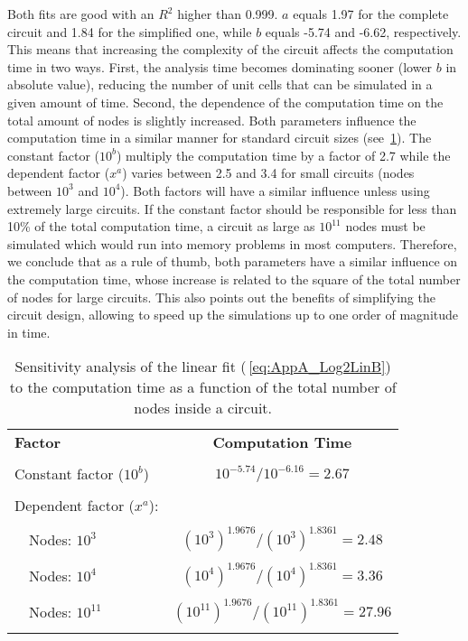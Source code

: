 Both fits are good with an $R^2$ higher than 0.999. $a$ equals 1.97 for the complete circuit and 1.84 for the simplified one, while $b$ equals -5.74 and -6.62, respectively. This means that increasing the complexity of the circuit affects the computation time in two ways. First, the analysis time becomes dominating sooner (lower $b$ in absolute value), reducing the number of unit cells that can be simulated in a given amount of time. Second, the dependence of the computation time on the total amount of nodes is slightly increased. Both parameters influence the computation time in a similar manner for standard circuit sizes (see \tab\,\ref{tab:AppA_ComputationTime}). The constant factor ($10^b$) multiply the computation time by a factor of 2.7 while the dependent factor ($x^a$) varies between 2.5 and 3.4 for small circuits (nodes between $10^3$ and $10^4$). Both factors will have a similar influence unless using extremely large circuits. If the constant factor should be responsible for less than 10\% of the total computation time, a circuit as large as $10^{11}$ nodes must be simulated which would run into memory problems in most computers. Therefore, we conclude that as a rule of thumb, both parameters have a similar influence on the computation time, whose increase is related to the square of the total number of nodes for large circuits. This also points out the benefits of simplifying the circuit design, allowing to speed up the simulations up to one order of magnitude in time.

\setlength{\extrarowheight}{0pt}
\begin{table}[h]
	\centering
	\caption[Sensitivity analysis of the linear fit to the computation time as a function of the total number of nodes inside a circuit.]{Sensitivity analysis of the linear fit (\equ\,\ref{eq:AppA_Log2LinB}) to the computation time as a function of the total number of nodes inside a circuit.}
	\label{tab:AppA_ComputationTime}
	\begin{tabularx}{.7\textwidth}{Xc}
	\toprule[\thicktopline]
	\textbf{Factor} & \textbf{Computation Time}\\
	\\[\tablerowheight]
	\toprule[\thicktopline]
	Constant factor ($10^b$) & $10^{-5.74}/10^{-6.16}= 2.67$\\
	\\[\tablerowheight]
	Dependent factor ($x^a$): &\\
	\\[\tablerowheight]
	\,\,\,\,\,\,Nodes: $10^3$ & $(10^3)^{1.9676}/(10^3)^{1.8361} = 2.48$\\
	\\[\tablerowheight]
	\,\,\,\,\,\,Nodes: $10^4$ & $(10^4)^{1.9676}/(10^4)^{1.8361} = 3.36$\\
	\\[\tablerowheight]
	\,\,\,\,\,\,Nodes: $10^{11}$ & $(10^{11})^{1.9676}/(10^{11})^{1.8361} = 27.96$\\
	\\[\tablerowheight]
	\bottomrule[\thickbottomline]
	\end{tabularx}
\end{table}


